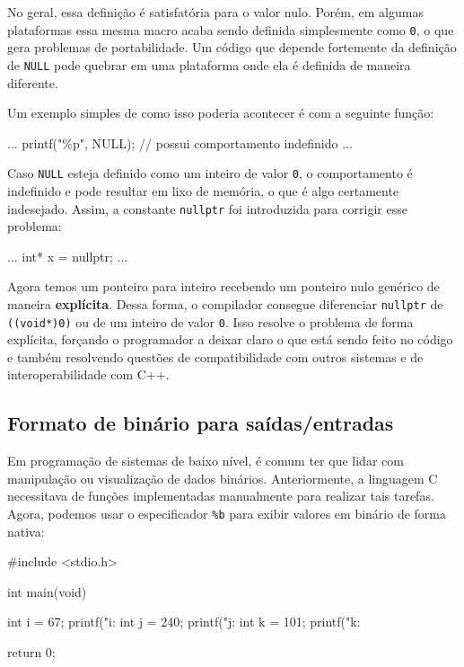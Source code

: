 No geral, essa definição é satisfatória para o valor nulo. Porém, em algumas 
plataformas essa mesma macro acaba sendo definida simplesmente como \texttt{0}, 
o que gera problemas de portabilidade. Um código que depende fortemente da 
definição de \texttt{NULL} pode quebrar em uma plataforma onde ela é definida 
de maneira diferente.

Um exemplo simples de como isso poderia acontecer é com a seguinte função:

\begin{excode}
...
printf("\%p\n", NULL);  // possui comportamento indefinido
...
\end{excode}

Caso \texttt{NULL} esteja definido como um inteiro de valor \texttt{0}, o 
comportamento é indefinido e pode resultar em lixo de memória, o que é algo 
certamente indesejado. Assim, a constante \texttt{nullptr} foi introduzida para 
corrigir esse problema:

\begin{excode}
...
int* x = nullptr;
...
\end{excode}

Agora temos um ponteiro para inteiro recebendo um ponteiro nulo genérico de 
maneira \textbf{explícita}. Dessa forma, o compilador consegue diferenciar 
\texttt{nullptr} de \texttt{((void*)0)} ou de um inteiro de valor \texttt{0}. 
Isso resolve o problema de forma explícita, forçando o programador a deixar 
claro o que está sendo feito no código e também resolvendo questões de 
compatibilidade com outros sistemas e de interoperabilidade com C++.

\subsection{Formato de binário para saídas/entradas}

Em programação de sistemas de baixo nível, é comum ter que lidar com 
manipulação ou visualização de dados binários. Anteriormente, a linguagem C 
necessitava de funções implementadas manualmente para realizar tais tarefas. 
Agora, podemos usar o especificador \texttt{\%b} para exibir valores em binário 
de forma nativa:

\begin{excode}
#include <stdio.h>

int main(void) {
    int i = 67;
    printf("i: %
    int j = 240;
    printf("j: %
    int k = 101;
    printf("k: %

    return 0;
}
\end{excode}

